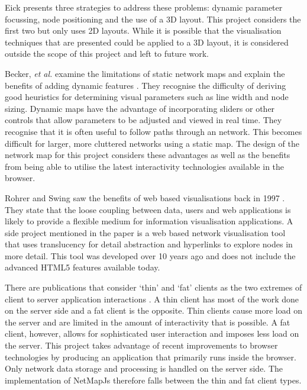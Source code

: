 \documentclass[11pt, a4paper]{article}
\begin{document}
Eick presents three strategies to address these problems: dynamic
parameter focussing, node positioning and the use of a 3D layout. This project
considers the first two but only uses 2D layouts. While it is possible that the
visualisation techniques that are presented could be applied to a 3D layout, it
is considered outside the scope of this project and left to future work.

Becker, \emph{et al.} examine the limitations of static network maps and explain
the benefits of adding dynamic features \cite{Becker_1990}. They recognise the
difficulty of deriving good heuristics for determining visual parameters such as
line width and node sizing. Dynamic maps have the advantage of incorporating
sliders or other controls that allow parameters to be adjusted and viewed in
real time. They recognise that it is often useful to follow paths through an
network. This becomes difficult for larger, more cluttered networks using
a static map. The design of the network map for this project considers these
advantages as well as the benefits from being able to utilise the latest
interactivity technologies available in the browser.


Rohrer and Swing saw the benefits of web based visualisations back in 1997
\cite{Rohrer_1997}. They state that the loose coupling between data, users and
web applications is likely to provide a flexible medium for information
visualisation applications.  A side project mentioned in the paper is a web
based network visualisation tool that uses translucency for detail abstraction
and hyperlinks to explore nodes in more detail. This tool was developed over 10
years ago and does not include the advanced HTML5 features available today.

  
There are publications that consider `thin' and `fat' clients as the two
extremes of client to server application interactions
\cite{Eick_2007}\cite{Jern_1998}. A thin client has most of the work done on the
server side and a fat client is the opposite. Thin clients cause more load on
the server and are limited in the amount of interactivity that is possible. A
fat client, however, allows for sophisticated user interaction and imposes less
load on the server. This project takes advantage of recent improvements to
browser technologies by producing an application that primarily runs inside the
browser. Only network data storage and processing is handled on the server side.
The implementation of NetMapJs therefore falls between the thin and fat client
types.
\end{document}
